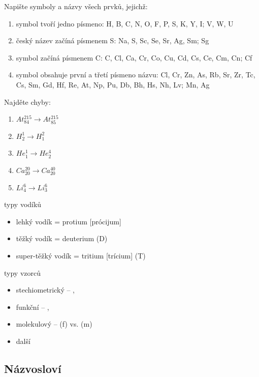 \documentclass{article}
\begin{document}
\begin{example}
  Napište symboly a názvy všech prvků, jejichž:
  \begin{enumerate}
    \item symbol tvoří jedno písmeno: H, B, C, N, O, F, P, S, K, Y, I; V, W, U
    \item český název začíná písmenem S: Na, S, Sc, Se, Sr, Ag, Sm; Sg
    \item symbol začíná písmenem C: C, Cl, Ca, Cr, Co, Cu, Cd, Cs, Ce, Cm, Cn; Cf
    \item symbol obsahuje první a třetí písmeno názvu: Cl, Cr, Zn, As, Rb, Sr, Zr, Tc, Cs, Sm, Gd, Hf, Re, At, Np, Pu, Db, Bh, Hs, Nh, Lv; Mn, Ag
  \end{enumerate}
\end{example}

\begin{example}
  Najděte chyby:
  \begin{enumerate}
    \item $At^215_84 \rightarrow At^215_85$
    \item $H^1_2 \rightarrow H^2_1$
    \item $He^1_1 \rightarrow He^4_2$
    \item $Ca^20_20 \rightarrow Ca^40_20$
    \item $Li^6_4 \rightarrow Li^6_3$
  \end{enumerate}
\end{example}

typy vodíků
\begin{itemize}
  \item lehký vodík = protium [prócijum]
  \item těžký vodík = deuterium (D)
  \item super-těžký vodík = tritium [trícium] (T)
\end{itemize}

typy vzorců
\begin{itemize}
  \item stechiometrický -- , 
  \item funkční -- , 
  \item molekulový -- (f) vs. (m)
  \item další
\end{itemize}

\subsection{Názvosloví}
\end{document}
